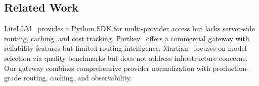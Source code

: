 \subsection{Related Work}

LiteLLM~\cite{litellm2023} provides a Python SDK for multi-provider access but lacks server-side routing, caching, and cost tracking. Portkey~\cite{portkey2024} offers a commercial gateway with reliability features but limited routing intelligence. Martian~\cite{martian2024} focuses on model selection via quality benchmarks but does not address infrastructure concerns. Our gateway combines comprehensive provider normalization with production-grade routing, caching, and observability.

